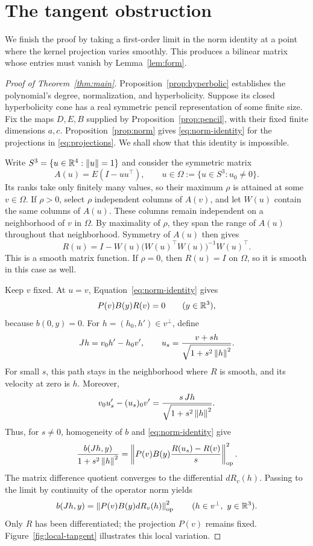 \section{The tangent obstruction}\label{sec:tangent}

We finish the proof by taking a first-order limit in the norm identity
at a point where the kernel projection varies smoothly. This produces
a bilinear matrix whose entries must vanish by Lemma~\ref{lem:form}.

\begin{proof}[Proof of Theorem~\ref{thm:main}]
Proposition~\ref{prop:hyperbolic} establishes the polynomial's degree,
normalization, and hyperbolicity. Suppose its closed hyperbolicity cone
has a real symmetric pencil representation of some finite size.
Fix the maps \(D,E,B\) supplied by Proposition~\ref{prop:pencil}, with
their fixed finite dimensions \(a,c\). Proposition~\ref{prop:norm} gives
\eqref{eq:norm-identity} for the projections in \eqref{eq:projections}.
We shall show that this identity is impossible.

Write \(S^3=\{u\in\mathbb R^4:\left\lVert u\right\rVert=1\}\) and consider the symmetric matrix
\[
 A(u)=E(I-uu^\top),\qquad
 u\in\Omega:=\{u\in S^3:u_0\ne0\}.
\]
Its ranks take only finitely many values, so their maximum \(\rho\) is
attained at some \(v\in\Omega\). If \(\rho>0\), select \(\rho\) independent
columns of \(A(v)\), and let \(W(u)\) contain the same columns of \(A(u)\).
These columns remain independent on a neighborhood of \(v\) in
\(\Omega\). By maximality of \(\rho\), they span the range of \(A(u)\)
throughout that neighborhood. Symmetry of \(A(u)\) then gives
\[
 R(u)=I-W(u)\bigl(W(u)^\top W(u)\bigr)^{-1}W(u)^\top .
\]
This is a smooth matrix function. If \(\rho=0\), then \(R(u)=I\) on
\(\Omega\), so it is smooth in this case as well.

Keep \(v\) fixed. At \(u=v\), Equation~\eqref{eq:norm-identity} gives
\[
 P(v)B(y)R(v)=0\qquad(y\in\mathbb R^3),
\]
because \(b(0,y)=0\). For \(h=(h_0,h')\in v^\perp\), define
\[
 Jh=v_0h'-h_0v',
 \qquad
 u_s=\frac{v+sh}{\sqrt{1+s^2\left\lVert h\right\rVert^2}}.
\]
For small \(s\), this path stays in the neighborhood where \(R\) is
smooth, and its velocity at zero is \(h\). Moreover,
\[
 v_0u_s'-(u_s)_0v'
   =\frac{s\,Jh}{\sqrt{1+s^2\left\lVert h\right\rVert^2}}.
\]
Thus, for \(s\ne0\), homogeneity of \(b\) and
\eqref{eq:norm-identity} give
\[
 \frac{b(Jh,y)}{1+s^2\left\lVert h\right\rVert^2}
 =
 \left\lVert P(v)B(y)\frac{R(u_s)-R(v)}{s}\right\rVert_{\mathrm{op}}^{2}.
\]
The matrix difference quotient converges to the differential
\(dR_v(h)\). Passing to the limit by continuity of the operator norm
yields
\begin{equation}\label{eq:tangent-identity}
 b(Jh,y)=\left\lVert P(v)B(y)dR_v(h)\right\rVert_{\mathrm{op}}^{2}
 \qquad(h\in v^\perp,\ y\in\mathbb R^3).
\end{equation}
Only \(R\) has been differentiated; the projection \(P(v)\) remains
fixed. Figure~\ref{fig:local-tangent} illustrates this local variation.


\end{proof}
